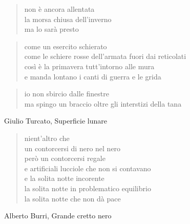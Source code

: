 
	\begin{verse}
		non è ancora allentata\\
		la morsa chiusa dell'inverno\\
		ma lo sarà presto
	\end{verse}

	\begin{verse}
		come un esercito schierato\\
		come le schiere rosse dell'armata fuori dai reticolati\\
		così è la primavera tutt'intorno alle mura\\
		e manda lontano i canti di guerra e le grida
	\end{verse}

	\begin{verse}
		io non sbircio dalle finestre\\
		ma spingo un braccio oltre gli interstizi della tana
	\end{verse}

\clearpage


\begin{artItem}
	Giulio Turcato, Superficie lunare
\end{artItem}

	\begin{verse}
		nient’altro che\\
		un contorcersi di nero nel nero\\
		però un contorcersi regale\\
		e artificiali lucciole che non si contavano\\
		e la solita notte incorente\\
		la solita notte in problematico equilibrio\\
		la solita notte che non dà pace
	\end{verse}

\clearpage


\begin{artItem}
	Alberto Burri, Grande cretto nero
\end{artItem}

